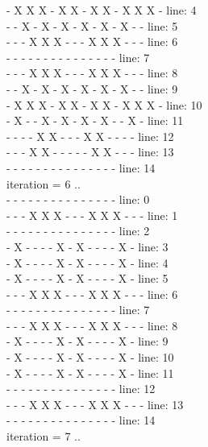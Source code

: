 \documentclass[a4paper, 14pt]{article}
\begin{document}
\begin{enumerate}
{ -  X  X  X  -  X  X  -  X  X  -  X  X  X  - 	line: 4\\
 -  -  X  -  X  -  X  -  X  -  X  -  X  -  - 	line: 5\\
 -  -  -  X  X  X  -  -  -  X  X  X  -  -  - 	line: 6\\
 -  -  -  -  -  -  -  -  -  -  -  -  -  -  - 	line: 7\\
 -  -  -  X  X  X  -  -  -  X  X  X  -  -  - 	line: 8\\
 -  -  X  -  X  -  X  -  X  -  X  -  X  -  - 	line: 9\\
 -  X  X  X  -  X  X  -  X  X  -  X  X  X  - 	line: 10\\
 -  X  -  -  X  -  X  -  X  -  X  -  -  X  - 	line: 11\\
 -  -  -  -  X  X  -  -  -  X  X  -  -  -  - 	line: 12\\
 -  -  -  X  X  -  -  -  -  -  X  X  -  -  - 	line: 13\\
 -  -  -  -  -  -  -  -  -  -  -  -  -  -  - 	line: 14\\
iteration = 6 ..\\
 -  -  -  -  -  -  -  -  -  -  -  -  -  -  - 	line: 0\\
 -  -  -  X  X  X  -  -  -  X  X  X  -  -  - 	line: 1\\
 -  -  -  -  -  -  -  -  -  -  -  -  -  -  - 	line: 2\\
 -  X  -  -  -  -  X  -  X  -  -  -  -  X  - 	line: 3\\
 -  X  -  -  -  -  X  -  X  -  -  -  -  X  - 	line: 4\\
 -  X  -  -  -  -  X  -  X  -  -  -  -  X  - 	line: 5\\
 -  -  -  X  X  X  -  -  -  X  X  X  -  -  - 	line: 6\\
 -  -  -  -  -  -  -  -  -  -  -  -  -  -  - 	line: 7\\
 -  -  -  X  X  X  -  -  -  X  X  X  -  -  - 	line: 8\\
 -  X  -  -  -  -  X  -  X  -  -  -  -  X  - 	line: 9\\
 -  X  -  -  -  -  X  -  X  -  -  -  -  X  - 	line: 10\\
 -  X  -  -  -  -  X  -  X  -  -  -  -  X  - 	line: 11\\
 -  -  -  -  -  -  -  -  -  -  -  -  -  -  - 	line: 12\\
 -  -  -  X  X  X  -  -  -  X  X  X  -  -  - 	line: 13\\
 -  -  -  -  -  -  -  -  -  -  -  -  -  -  - 	line: 14\\
iteration = 7 ..\\
}
\end{enumerate}
\end{document}
